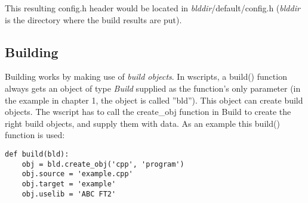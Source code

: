 \documentclass[a4,10pt]{article}
\begin{document}
This resulting config.h header would be located in \emph{blddir}/default/config.h (\emph{blddir} is the directory where the build results are put).

\subsection{Building}
Building works by making use of \emph{build objects}. In wscripts, a build() function always gets an object of type \emph{Build} supplied as the function's only parameter (in the example in chapter 1, the object is called ''bld''). This object can create build objects. The wscript has to call the create\_obj function in Build to create the right build objects, and supply them with data. As an example this build() function is used:
\\
\begin{center}
	\begin{lstlisting}[caption=\footnotesize The example build() function]
def build(bld):
    obj = bld.create_obj('cpp', 'program')
    obj.source = 'example.cpp'
    obj.target = 'example'
    obj.uselib = 'ABC FT2'
	\end{lstlisting}
\end{center}
\end{document}
